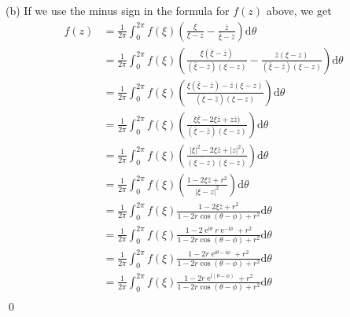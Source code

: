 \documentclass[10pt]{amsart}
\newcommand{\D}{\mathrm{d}}
\newcommand{\I}{\mathrm{i}}
\DeclareMathOperator{\E}{e}
\theoremstyle{nonumberplain}
\begin{document}
\begin{enumerate}[label={\bf {\arabic*}:}]
\noindent
(b) If we use the minus sign in the formula for $f(z)$ above, we get
\begin{align*}
f(z) &= \frac 1 {2\pi} \int_0^{2\pi} f(\xi) \left( \frac{\xi}{\xi - z} - \frac{\bar z}{\bar \xi - \bar z} \right) \D \theta \\
	&= \frac 1 {2\pi} \int_0^{2\pi} f(\xi) \left( \frac{\xi (\bar \xi - \bar z)}{(\bar \xi - \bar z)(\xi - z)} - \frac{\bar z (\xi - z)}{(\bar \xi - \bar z)(\xi - z)} \right) \D \theta \\
	&= \frac 1 {2\pi} \int_0^{2\pi} f(\xi) \left( \frac{\xi (\bar \xi - \bar z)- \bar z (\xi - z)}{(\bar \xi - \bar z)(\xi - z)}\right) \D \theta \\
	&= \frac 1 {2\pi} \int_0^{2\pi} f(\xi) \left( \frac{\xi\bar \xi - 2\xi \bar z + z \bar z)}{(\bar \xi - \bar z)(\xi - z)}\right) \D \theta \\
	&= \frac 1 {2\pi} \int_0^{2\pi} f(\xi) \left( \frac{|\xi|^2 - 2\xi \bar z + |z|^2)}{\overline{(\xi - z)}(\xi - z)}\right) \D \theta \\
	&= \frac 1 {2\pi} \int_0^{2\pi} f(\xi) \left( \frac{1 - 2\xi \bar z + r^2}{\left|\xi - z\right|^2}\right) \D \theta \\
	&= \frac 1 {2\pi} \int_0^{2\pi} f(\xi) \frac{1 - 2\xi \bar z + r^2}{1 - 2r \cos (\theta - \phi) + r^2} \D \theta \\
	&= \frac 1 {2\pi} \int_0^{2\pi} f(\xi) \frac{1 - 2\E^{\I \theta} r\E^{-\I \phi} + r^2}{1 - 2r \cos (\theta - \phi) + r^2} \D \theta \\
	&= \frac 1 {2\pi} \int_0^{2\pi} f(\xi) \frac{1 - 2r \E^{\I \theta - \I \phi} + r^2}{1 - 2r \cos (\theta - \phi) + r^2} \D \theta \\
	&= \frac 1 {2\pi} \int_0^{2\pi} f(\xi) \frac{1 - 2r \E^{\I (\theta - \phi)} + r^2}{1 - 2r \cos (\theta - \phi) + r^2} \D \theta \\
\end{align*}
\qed \\


\end{enumerate}
\end{document}
